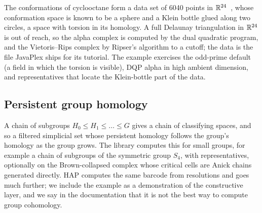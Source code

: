 The conformations of cyclooctane form a data set of 6040 points in $\mathbb{R}^{24}$~\cite{martin2010cyclooctane}, whose conformation space is
known to be a sphere and a Klein bottle glued along two circles, a space with torsion in its homology. A full Delaunay triangulation
in $\mathbb{R}^{24}$ is out of reach, so the alpha complex is computed by the dual quadratic program, and the Vietoris--Rips complex by Ripser's
algorithm to a cutoff; the data is the file JavaPlex ships for its tutorial. The example exercises the odd-prime
default (a field in which the torsion is visible), DQP alpha in high ambient dimension, and representatives that locate the
Klein-bottle part of the data.

\subsection{Persistent group homology}\label{sec:group}

A chain of subgroups $H_0\le H_1\le\dots\le G$ gives a chain of classifying spaces, and so a filtered simplicial set whose
persistent homology follows the group's homology as the group grows. The library computes this for small groups, for example a
chain of subgroups of the symmetric group $S_4$, with representatives, optionally on the Brown-collapsed complex whose
critical cells are Anick chains generated directly. HAP computes the same barcode from resolutions and goes much
further; we include the example as a demonstration of the constructive layer, and we say in the documentation that it is not
the best way to compute group cohomology.
